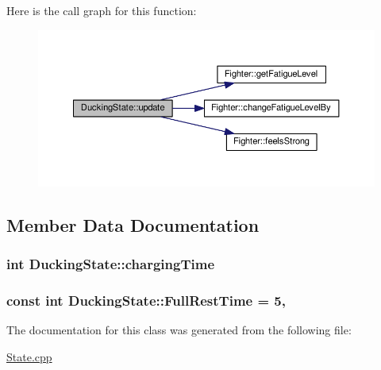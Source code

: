 Here is the call graph for this function\+:
\nopagebreak
\begin{figure}[H]
\begin{center}
\leavevmode
\includegraphics[width=350pt]{classDuckingState_a634612b9f2d152c8805366541a775504_cgraph}
\end{center}
\end{figure}




\subsection{Member Data Documentation}
\subsubsection[{\texorpdfstring{charging\+Time}{chargingTime}}]{\setlength{\rightskip}{0pt plus 5cm}int Ducking\+State\+::charging\+Time\hspace{0.3cm}{\ttfamily [private]}}\hypertarget{classDuckingState_abb35456dc6b1c0fc15b2238ceafbb817}{}\label{classDuckingState_abb35456dc6b1c0fc15b2238ceafbb817}
\subsubsection[{\texorpdfstring{Full\+Rest\+Time}{FullRestTime}}]{\setlength{\rightskip}{0pt plus 5cm}const int Ducking\+State\+::\+Full\+Rest\+Time = 5\hspace{0.3cm}{\ttfamily [static]}, {\ttfamily [private]}}\hypertarget{classDuckingState_a1af568ef268261b3be1773b23d343b4a}{}\label{classDuckingState_a1af568ef268261b3be1773b23d343b4a}


The documentation for this class was generated from the following file\+:\begin{DoxyCompactItemize}
\item 
\hyperlink{State_8cpp}{State.\+cpp}\end{DoxyCompactItemize}
